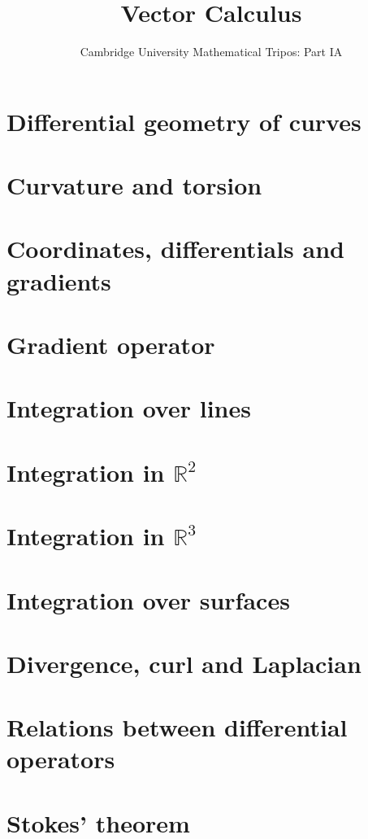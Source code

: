 \documentclass{article}
\title{Vector Calculus}
\author{Cambridge University Mathematical Tripos: Part IA}
\begin{document}
\maketitle

\tableofcontentsnewpage{}

\section{Differential geometry of curves}

\section{Curvature and torsion}

\section{Coordinates, differentials and gradients}

\section{Gradient operator}

\section{Integration over lines}

\section{Integration in \(\mathbb R^2\)}

\section{Integration in \(\mathbb R^3\)}

\section{Integration over surfaces}

\section{Divergence, curl and Laplacian}

\section{Relations between differential operators}

\section{Stokes' theorem}

\end{document}
